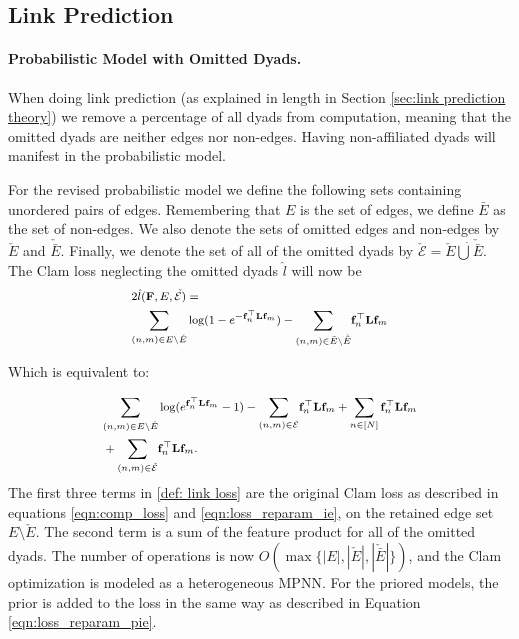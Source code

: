 \documentclass[letterpaper]{article} %
\begin{document}
\subsection{Link Prediction}
\label{sec: link prediction experiment}
\paragraph{Probabilistic Model with Omitted Dyads.} 
When doing link prediction (as explained in length in Section \ref{sec:link prediction theory}) we remove a percentage of all dyads from computation, meaning that the omitted dyads are neither edges nor non-edges. Having non-affiliated dyads will manifest in the probabilistic model.

For the revised probabilistic model we define the following sets containing unordered pairs of edges. Remembering that $E$ is the set of edges, we define $\bar{E}$ as the set of non-edges. We also denote the sets of omitted edges and non-edges by $\check{E}$ and $\check{\bar{E}}$. Finally, we denote the set of all of the omitted dyads by $\check{\mathcal{E}} = \check{E}\dot\bigcup \check{\bar E}$. The Clam loss neglecting the omitted dyads $\hat{l}$ will now be
\begin{equation}
\footnotesize    
\begin{split}
&2\hat{l}(\mathbf{F}, E, \check{\mathcal{E})} = \\
&\underset{(n,m)\in E\setminus\check{E}}{\sum} \log(1-e^{-\mathbf{f}_n^\top \mathbf{L} \mathbf{f}_m}) - \underset{(n,m)\in \bar{E}\setminus\check{\bar{E}}}{\sum} \mathbf{f}_n^\top \mathbf{L} \mathbf{f}_m
\end{split}
\end{equation}

Which is equivalent to:

\begin{equation}
\footnotesize
\begin{split}
& \underset{(n,m)\in E\setminus\check{E}}{\sum} \log(e^{\mathbf{f}_n^\top \mathbf{L} \mathbf{f}_m}-1) - \underset{(n,m)\in \mathcal{E}}{\sum} \mathbf{f}_n^\top \mathbf{L} \mathbf{f}_m + \sum_{n \in [N]} \mathbf{f}_n^\top \mathbf{L} \mathbf{f}_m\\ 
&+ \underset{(n,m) \in \check{\mathcal{E}}}{\sum}\mathbf{f}_n^\top \mathbf{L} \mathbf{f}_m.
\end{split}
\label{def: link loss}
\end{equation}
The first three terms in \ref{def: link loss} are the original Clam loss as described in equations \ref{eqn:comp_loss} and \ref{eqn:loss_reparam_ie}, on the retained edge set $E\setminus \check{E}$. The second term is a sum of the feature product for all of the omitted dyads. The number of operations is now $O(\max \big\{|E|, |\check{E}|, |\check{\bar{E}}| \big\})$, and the Clam optimization is modeled as a heterogeneous MPNN. For the priored models, the prior is added to the loss in the same way as described in Equation \ref{eqn:loss_reparam_pie}.
\end{document}
